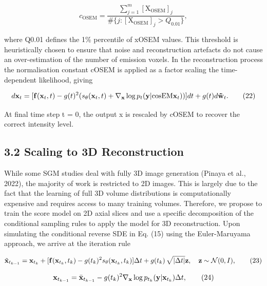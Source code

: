 \documentclass{article}
\begin{document}
$$c_{\text{OSEM}}=\frac{\sum_{j=1}^{m}[\text{X}_{\text{OSEM}}]_{j}}{\#\{j:[\text{X}_{\text{OSEM}}]_{j}>Q_{0.01}\}},\tag{21}$$

where Q0.01 defines the 1\% percentile of xOSEM values. This threshold is heuristically chosen to ensure that noise and reconstruction artefacts do not cause an over-estimation of the number of emission voxels. In the reconstruction process the normalisation constant cOSEM is applied as a factor scaling the time-dependent likelihood, giving

$$d{\bf x}_{t}=[{\bf f}({\bf x}_{t},t)-g(t)^{2}(s_{\theta}({\bf x}_{t},t)+\nabla_{\bf x}\log p_{t}({\bf y}|{\rm cosEM}{\bf x}_{t}))]dt+g(t)d{\bf\tilde{w}}_{t}.\tag{22}$$

At final time step t = 0, the output x is rescaled by cOSEM to recover the correct intensity level.

\subsection{3.2 Scaling to 3D Reconstruction}

While some SGM studies deal with fully 3D image generation (Pinaya et al., 2022), the majority of work is restricted to 2D images. This is largely due to the fact that the learning of full 3D volume distributions is computationally expensive and requires access to many training volumes. Therefore, we propose to train the score model on 2D axial slices and use a specific decomposition of the conditional sampling rules to apply the model for 3D reconstruction. Upon simulating the conditional reverse SDE in Eq. (15) using the Euler-Maruyama approach, we arrive at the iteration rule

$$\tilde{\bf x}_{t_{k-1}}={\bf x}_{t_{k}}+[{\bf f}({\bf x}_{t_{k}},t_{k})-g(t_{k})^{2}s_{\theta}({\bf x}_{t_{k}},t_{k})]\Delta t+g(t_{k})\,\sqrt{|\Delta t|}{\bf z},\quad{\bf z}\sim{\cal N}(0,I),\tag{23}$$

$${\bf x}_{t_{k-1}}=\bar{\bf x}_{t_{k-1}}-g(t_{k})^{2}\nabla_{\bf x}\log p_{t_{k}}({\bf y}|{\bf x}_{t_{k}})\Delta t,\tag{24}$$
\end{document}
